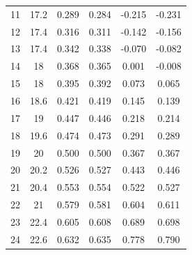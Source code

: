 \begin{table}[H]
\begin{tabular}{cccccc}
    11         & 17.2                        & 0.289                      & 0.284                       & -0.215                  & -0.231                  \\
    12         & 17.4                        & 0.316                      & 0.311                       & -0.142                  & -0.156                  \\
    13         & 17.4                        & 0.342                      & 0.338                       & -0.070                  & -0.082                  \\
    14         & 18                          & 0.368                      & 0.365                       & 0.001                   & -0.008                  \\
    15         & 18                          & 0.395                      & 0.392                       & 0.073                   & 0.065                   \\
    16         & 18.6                        & 0.421                      & 0.419                       & 0.145                   & 0.139                   \\
    17         & 19                          & 0.447                      & 0.446                       & 0.218                   & 0.214                   \\
    18         & 19.6                        & 0.474                      & 0.473                       & 0.291                   & 0.289                   \\
    19         & 20                          & 0.500                      & 0.500                       & 0.367                   & 0.367                   \\
    20         & 20.2                        & 0.526                      & 0.527                       & 0.443                   & 0.446                   \\
    21         & 20.4                        & 0.553                      & 0.554                       & 0.522                   & 0.527                   \\
    22         & 21                          & 0.579                      & 0.581                       & 0.604                   & 0.611                   \\
    23         & 22.4                        & 0.605                      & 0.608                       & 0.689                   & 0.698                   \\
    24         & 22.6                        & 0.632                      & 0.635                       & 0.778                   & 0.790                   \\

\end{tabular}
\end{table}
